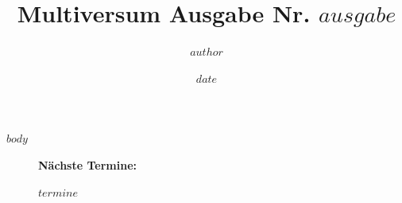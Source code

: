\documentclass[a4paper,11pt,oneside,twocolumn,final,article]{memoir}
\author{$author$}
\date{$date$}
\title{Multiversum Ausgabe Nr. $ausgabe$}
\begin{document}

$body$

\begin{figure}[!b]
	\begin{framed}
		\textbf{Nächste Termine:} \par 
		$termine$
	\end{framed}
\end{figure}
\end{document}

